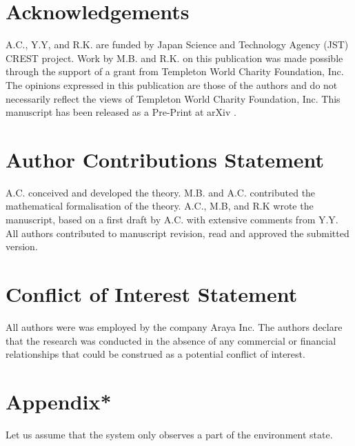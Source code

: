 \documentclass[utf8]{article}
\begin{document}
	\section*{Acknowledgements}
	A.C., Y.Y, and R.K. are funded by Japan Science and Technology Agency (JST) CREST project. Work by M.B. and R.K. on this publication was made possible through the support of a grant from Templeton World Charity Foundation, Inc. The opinions expressed in this publication are those of the authors and do not necessarily reflect the views of Templeton World Charity Foundation, Inc. This manuscript has been released as a Pre-Print at arXiv \citep{chang2019information}.


    \section*{Author Contributions Statement}
    A.C. conceived and developed the theory. M.B. and A.C. contributed the mathematical formalisation of the theory. A.C., M.B, and R.K wrote the manuscript, based on a first draft by A.C. with extensive comments from Y.Y. All authors contributed to manuscript revision, read and approved the submitted version.

    \section*{Conflict of Interest Statement}
    All authors were was employed by the company Araya Inc. The authors declare that the research was conducted in the absence of any commercial or financial relationships that could be construed as a potential conflict of interest.
\section{Appendix*}
\label{sec:appendix}
            Let us assume that the system only observes a part of the environment state.
            
\end{document}
